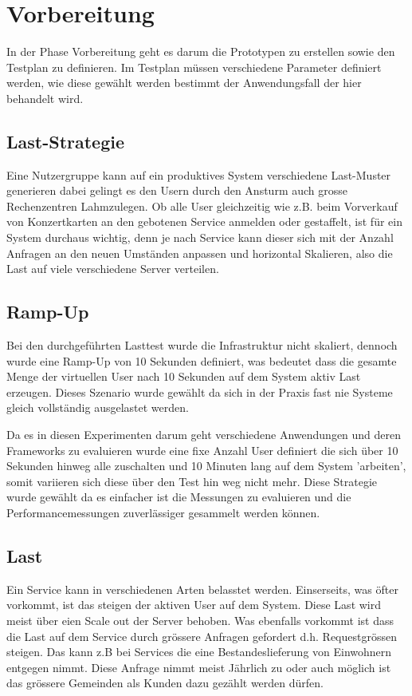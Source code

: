\documentclass[main.tex]{subfiles}
\begin{document}
\section{Vorbereitung}
In der Phase Vorbereitung geht es darum die Prototypen zu erstellen sowie den Testplan zu definieren. 
Im Testplan müssen verschiedene Parameter definiert werden, wie diese gewählt werden bestimmt der Anwendungsfall der hier behandelt wird.

\subsection{Last-Strategie}
Eine Nutzergruppe kann auf ein produktives System verschiedene Last-Muster generieren dabei gelingt es den Usern durch den Ansturm auch grosse Rechenzentren Lahmzulegen. Ob alle User gleichzeitig wie z.B. beim Vorverkauf von Konzertkarten an den gebotenen Service anmelden oder gestaffelt, ist für ein System durchaus wichtig, denn je nach Service kann dieser sich mit der Anzahl Anfragen an den neuen Umständen anpassen und  horizontal Skalieren, also die Last auf viele verschiedene Server verteilen. 

\subsection{Ramp-Up}
Bei den durchgeführten Lasttest wurde die Infrastruktur nicht skaliert, dennoch wurde eine Ramp-Up von 10 Sekunden definiert, was bedeutet dass die gesamte Menge der virtuellen User nach 10 Sekunden auf dem System aktiv Last erzeugen. Dieses Szenario wurde gewählt da sich in der Praxis fast nie Systeme gleich vollständig ausgelastet werden. 

Da es in diesen Experimenten darum geht verschiedene Anwendungen und deren Frameworks zu evaluieren wurde eine fixe Anzahl User definiert die sich über 10 Sekunden hinweg alle zuschalten und  10 Minuten lang auf dem System 'arbeiten', somit variieren sich diese über den Test hin weg nicht mehr. Diese Strategie wurde gewählt da es einfacher ist die Messungen zu evaluieren und die Performancemessungen zuverlässiger gesammelt werden können. 

\subsection{Last}
Ein Service kann in verschiedenen Arten belasstet werden. Einserseits, was öfter vorkommt, ist das steigen der aktiven User auf dem System. Diese Last wird meist über eien Scale out der Server behoben. Was ebenfalls vorkommt ist dass die Last auf dem Service durch grössere Anfragen gefordert d.h. Requestgrössen steigen. Das kann z.B bei Services die  eine Bestandeslieferung von Einwohnern entgegen nimmt. Diese Anfrage nimmt meist Jährlich zu oder auch möglich ist das grössere Gemeinden als Kunden dazu gezählt werden dürfen.  
\end{document}
